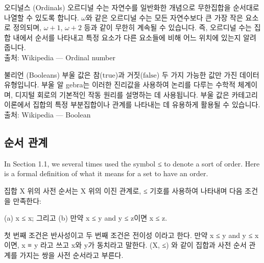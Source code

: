 \documentclass[11pt, a4paper, twoside, openany]{book}
\begin{document}
\begin{deepresearch}{오디널스 (Ordinals)}
오르디널 수는 자연수를 일반화한 개념으로 무한집합을 순서대로 나열할 수 있도록 합니다.  $ω$와 같은 오르디널 수는 모든 자연수보다 큰 가장 작은 요소로 정의되며, $ω+1$, $ω+2$ 등과 같이 무한히 계속될 수 있습니다. 즉, 오르디널 수는 집합 내에서 순서를 나타내고 특정 요소가 다른 요소들에 비해 어느 위치에 있는지 알려줍니다.
\\[4pt]{\footnotesize\color{ctgray} 출처: Wikipedia — Ordinal number}
\end{deepresearch}

\begin{deepresearch}{불리언 (Booleans)}
부울 값은 참($\text{true}$)과 거짓($\text{false}$) 두 가지 가능한 값만 가진 데이터 유형입니다. 부울 알 gebra\hspace{0pt}는 이러한 진리값을 사용하여 논리를 다루는 수학적 체계이며, 디지털 회로의 기본적인 작동 원리를 설명하는 데 사용됩니다.  부울 값은 카테고리 이론에서 집합의 특정 부분집합이나 관계를 나타내는 데 유용하게 활용될 수 있습니다.
\\[4pt]{\footnotesize\color{ctgray} 출처: Wikipedia — Boolean}
\end{deepresearch}


\subsection{순서 관계}
\label{sec:1-2-2}

In Section 1.1, we several times used the symbol ≤ to denote a sort of order. Here is a
formal definition of what it means for a set to have an order.

\par\medskip
\begin{definitionbox}[정의 1.30.]
집합 X 위의 사전 순서는 X 위의 이진 관계로,  ≤ 기호를 사용하여 나타내며 다음 조건을 만족한다:
\end{definitionbox}

\par\medskip
(a) x ≤ x; 그리고
(b) 만약 x ≤ y and y ≤ z\hspace{0pt}이면 x ≤ z.

\par\medskip
첫 번째 조건은 반사성이고 두 번째 조건은 전이성 이라고 한다. 만약 x ≤ y and y ≤ x 이면, x ≡ y 라고 쓰고 x\hspace{0pt}와 y\hspace{0pt}가 동치라고 말한다.  (X, ≤) 와 같이 집합과 사전 순서 관계를 가지는 쌍을 사전 순서라고 부른다.
\end{document}
